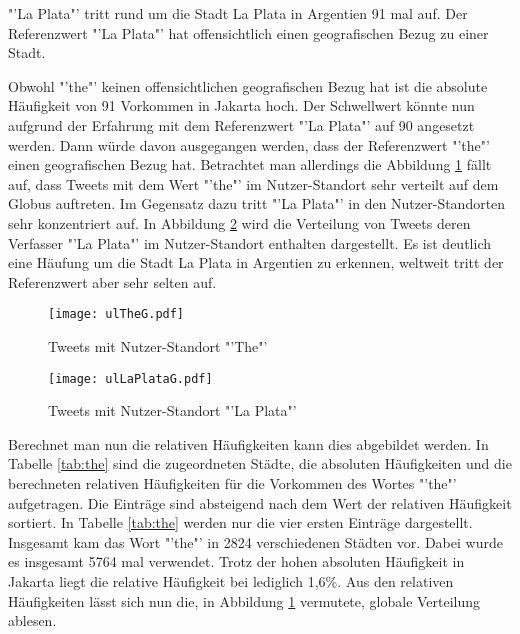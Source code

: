				"'La Plata"' tritt rund um die Stadt La Plata in Argentien 91 mal auf.
				Der Referenzwert "'La Plata"' hat offensichtlich einen geografischen Bezug zu einer Stadt. 

				Obwohl "'the"' keinen offensichtlichen geografischen Bezug hat ist die absolute Häufigkeit von 91 Vorkommen in Jakarta hoch.
				Der Schwellwert könnte nun aufgrund der Erfahrung mit dem Referenzwert "'La Plata"' auf 90 angesetzt werden.
				Dann würde davon ausgegangen werden, dass der Referenzwert "'the"' einen geografischen Bezug hat.
				Betrachtet man allerdings die Abbildung \ref{img:ULThe} fällt auf, dass Tweets mit dem Wert "'the"' im Nutzer-Standort sehr verteilt auf dem Globus auftreten.
				Im Gegensatz dazu tritt "'La Plata"' in den Nutzer-Standorten sehr konzentriert auf.
				In Abbildung \ref{img:ULlaPlata} wird die Verteilung von Tweets deren Verfasser "'La Plata"' im Nutzer-Standort enthalten dargestellt. 
				Es ist deutlich eine Häufung um die Stadt La Plata in Argentien zu erkennen, weltweit tritt der Referenzwert aber sehr selten auf.
				\begin{figure} 
					\begin{center}
						\texttt{[image: ulTheG.pdf]}
						\caption{Tweets mit Nutzer-Standort "'The"'}
						\label{img:ULThe}
						\end{center}
					\end{figure}
				\begin{figure}
				\begin{center}
						\texttt{[image: ulLaPlataG.pdf]}
						\caption{Tweets mit Nutzer-Standort "'La Plata"'}
						\label{img:ULlaPlata}
					\end{center}
			\end{figure}		
				
				Berechnet man nun die relativen Häufigkeiten kann dies abgebildet werden.
				In Tabelle \ref{tab:the} sind die zugeordneten Städte, die absoluten Häufigkeiten und die berechneten relativen Häufigkeiten für die Vorkommen des Wortes "'the"' aufgetragen. 
				Die Einträge sind absteigend nach dem Wert der relativen Häufigkeit sortiert.
				In Tabelle \ref{tab:the} werden nur die vier ersten Einträge dargestellt.  
				Insgesamt kam das Wort "'the"' in 2824 verschiedenen Städten vor.
				Dabei wurde es insgesamt 5764 mal verwendet. 
				Trotz der hohen absoluten Häufigkeit in Jakarta liegt die relative Häufigkeit bei lediglich 1,6\%.
				Aus den relativen Häufigkeiten lässt sich nun die, in Abbildung \ref{img:ULThe} vermutete, globale Verteilung ablesen.


